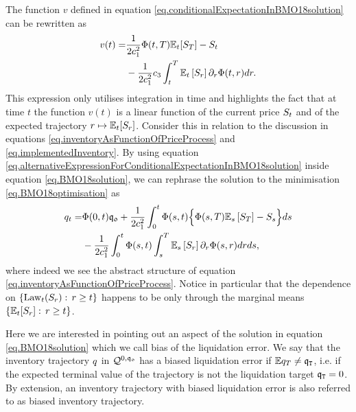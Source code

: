 \documentclass[10pt,a4paper]{article}
\begin{document}
The function $v$ defined in equation \eqref{eq.conditionalExpectationInBMO18solution} can be rewritten as 
\begin{equation}\label{eq.alternativeExpressionForConditionalExpectationInBMO18solution}
\begin{split}
v(t) = &\frac{1}{2c_{1}^{2}} \Phi(t,T) \mathbb{{E}}_t [S_T] - S_t \\
& - \frac{1}{2c_{1}^{2}}c_{3} \int_{t}^{T} \mathbb{{E}}_t\left[ S_r\right] \partial_r \Phi(t,r)dr.
\end{split}
\end{equation}
This expression only utilises integration in time and highlights the fact that at time $t$ the function $v(t)$ is a linear function of the current price $S_{t}$ and of the expected trajectory $r \mapsto \mathbb{{E}}_t [S_r]$. Consider this in relation to the discussion in equations \eqref{eq.inventoryAsFunctionOfPriceProcess} and \eqref{eq.implementedInventory}. By using equation \eqref{eq.alternativeExpressionForConditionalExpectationInBMO18solution} inside equation \eqref{eq.BMO18solution}, we can rephrase the solution to the minimisation \eqref{eq.BMO18optimisation} as 
\begin{equation}\label{eq.BMO18inventoryAsFunctionOfMarginals}
\begin{split}
q_t =& \Phi(0,t)\mathfrak{q_0} + \frac{1}{2c_{1}^{2}} \int_{0}^{t} \Phi(s,t)
\Big\lbrace
\Phi(s,T) \mathbb{{E}}_s \left[S_T\right] - S_s
 \Big\rbrace ds \\
 & - 
 \frac{1}{2c_{1}^{2}} \int_{0}^{t} \Phi(s,t)
 \int_{s}^{T} \mathbb{{E}}_s\left[ S_r\right] \partial_r \Phi(s,r)dr ds,
 \end{split}
\end{equation}
where indeed we see the abstract structure of equation \eqref{eq.inventoryAsFunctionOfPriceProcess}. Notice in particular that the dependence on $\lbrace \text{Law}_t (S_r): \, r \geq t\rbrace $ happens to be only through the marginal means $\lbrace \mathbb{{E}}_t [S_r]: \, r \geq t\rbrace $. 


Here we are interested in pointing out an aspect of the solution in equation \eqref{eq.BMO18solution} which we call bias of the liquidation error. We say that the inventory trajectory $q$ in $\mathcal{Q}^{0,\mathfrak{q_0}}$ has a biased liquidation error if $\mathbb{{E}} q_T \neq \mathfrak{q}_{\mathtt{T} }$, i.e. if the expected terminal value of the trajectory is not the liquidation target $\mathfrak{q}_{\mathtt{T} } = 0$. By extension, an inventory trajectory with biased liquidation error is also referred to as biased inventory trajectory. 
\end{document}
